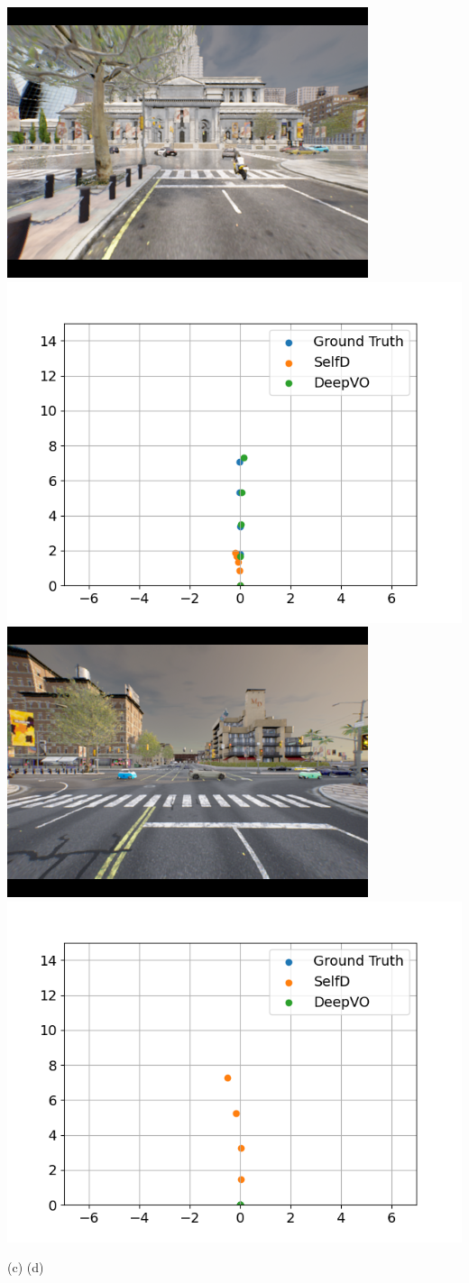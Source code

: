 \documentclass[12pt, letterpaper,cleardoubleempty,BCOR1cm]{scrbook}
\begin{document}
{\begin{minipage}{\textwidth}
\begin{center}
\includegraphics[trim={1.5cm 0.75cm 1.5cm 0.75cm},clip,height=0.19\textwidth]{./img/compare/9.png}
\includegraphics[trim={1cm 0.5cm 1.5cm 1cm},clip,height=0.19\textwidth]{./img/compare/9_wp.png}
\hfill
\includegraphics[trim={1.5cm 0.75cm 1.5cm 0.75cm},clip,height=0.19\textwidth]{./img/compare/10.png}
\includegraphics[trim={1cm 0.5cm 1.5cm 1cm},clip,height=0.19\textwidth]{./img/compare/10_wp.png}

\hspace{0.19\textwidth} (c) \hfill (d) \hspace{0.19\textwidth}
\vspace{5pt}


\end{center}
\end{minipage}}
\end{document}
